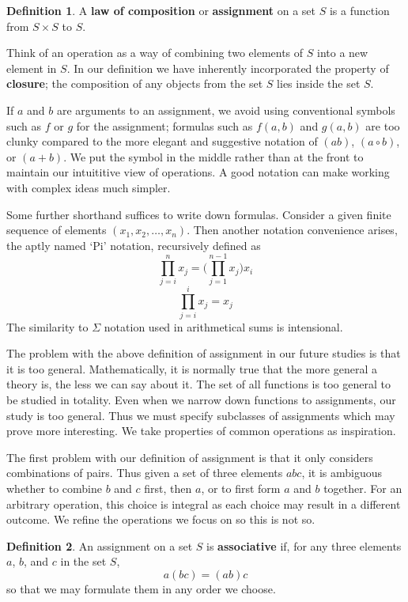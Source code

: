 \documentclass[12pt]{amsbook}
\theoremstyle{plain}
\theoremstyle{definition}
\newtheorem{definition}{Definition}
\begin{document}
\begin{definition} A {\bf law of composition} or {\bf assignment} on a set $S$ is a function from $S \times S$ to $S$. \end{definition}

Think of an operation as a way of combining two elements of $S$ into a new element in $S$. In our definition we have inherently incorporated the property of {\bf closure}; the composition of any objects from the set $S$ lies inside the set $S$.

If $a$ and $b$ are arguments to an assignment, we avoid using conventional symbols such as $f$ or $g$ for the assignment; formulas such as $f(a,b)$ and $g(a,b)$ are too clunky compared to the more elegant and suggestive notation of $(ab)$, $(a \circ b)$, or $(a + b)$. We put the symbol in the middle rather than at the front to maintain our intuititive view of operations. A good notation can make working with complex ideas much simpler.

Some further shorthand suffices to write down formulas. Consider a given finite sequence of elements $(x_1,x_2, \dots, x_n)$. Then another notation convenience arises, the aptly named `Pi' notation, recursively defined as
%
\[ \prod_{j = i}^n x_j = \big( \prod_{j = 1}^{n-1} x_j \big) x_i \]
\[ \prod_{j = i}^i x_j = x_j \]
%
The similarity to $\Sigma$ notation used in arithmetical sums is intensional.

The problem with the above definition of assignment in our future studies is that it is too general. Mathematically, it is normally true that the more general a theory is, the less we can say about it. The set of all functions is too general to be studied in totality. Even when we narrow down functions to assignments, our study is too general. Thus we must specify subclasses of assignments which may prove more interesting. We take properties of common operations as inspiration.

The first problem with our definition of assignment is that it only considers combinations of pairs. Thus given a set of three elements $abc$, it is ambiguous whether to combine $b$ and $c$ first, then $a$, or to first form $a$ and $b$ together. For an arbitrary operation, this choice is integral as each choice may result in a different outcome. We refine the operations we focus on so this is not so.

\begin{definition}
    An assignment on a set $S$ is {\bf associative} if, for any three elements $a$, $b$, and $c$ in the set $S$,
    \[ a(bc) = (ab)c \]
    so that we may formulate them in any order we choose.
\end{definition}
\end{document}
